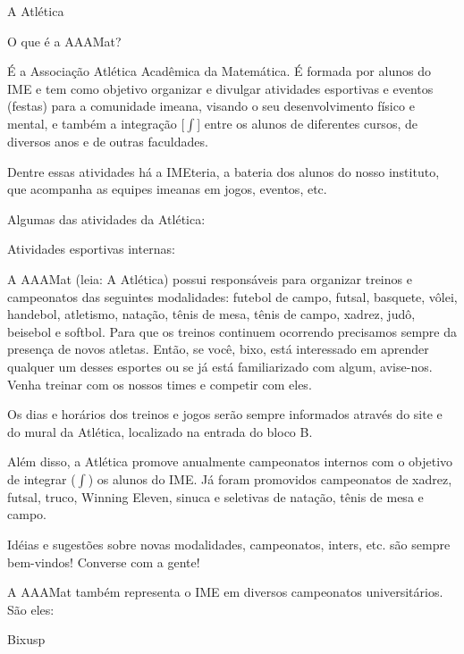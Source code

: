 \begin{secao}{A Atlética}

\begin{subsecao}{O que é a AAAMat?}

É a Associação Atlética Acadêmica da Matemática. É formada por alunos do IME e
tem como objetivo organizar e divulgar atividades esportivas e eventos (festas)
para a comunidade imeana, visando o seu desenvolvimento físico e mental,
e também a integração [$\int$] entre os alunos de diferentes cursos, de diversos
anos e de outras faculdades.

Dentre essas atividades há a IMEteria, a bateria dos alunos do nosso instituto,
que acompanha as equipes imeanas em jogos, eventos, etc.

\end{subsecao}

Algumas das atividades da Atlética:

\begin{subsecao}{Atividades esportivas internas:}

A AAAMat (leia: A Atlética) possui responsáveis para organizar treinos e campeonatos das seguintes 
modalidades: futebol de campo, futsal, basquete, vôlei, handebol, atletismo, 
natação, tênis de mesa, tênis de campo, xadrez, judô, beisebol e softbol. Para 
que os treinos continuem ocorrendo precisamos sempre da presença de novos 
atletas. Então, se você, bixo, está interessado em aprender qualquer um desses 
esportes ou se já está familiarizado com algum, avise-nos. Venha treinar com os 
nossos times e competir com eles.

Os dias e horários dos treinos e jogos serão sempre informados através do site
e do mural da Atlética, localizado na entrada do bloco B.

Além disso, a Atlética promove anualmente campeonatos internos com o objetivo de
integrar ($\int$) os alunos do IME. Já foram promovidos campeonatos de xadrez,
futsal, truco, Winning Eleven, sinuca e seletivas de natação, tênis de mesa e 
campo.

Idéias e sugestões sobre novas modalidades, campeonatos, inters, etc. são sempre
 bem-vindos! Converse com a gente!

\end{subsecao}

A AAAMat também representa o IME em diversos campeonatos universitários. São
eles:

\begin{subsecao}{Bixusp}


\end{subsecao}
\end{secao}
